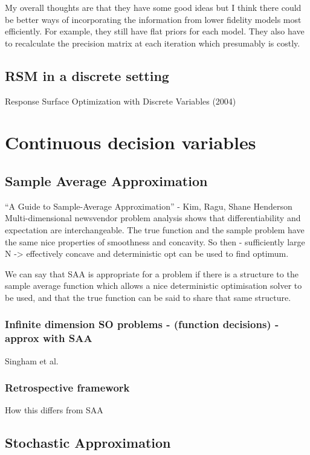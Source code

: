 \documentclass{article}
\begin{document}
My overall thoughts are that they have some good ideas but I think there could be better ways of incorporating the information from lower fidelity models most efficiently. For example, they still have flat priors for each model. They also have to recalculate the precision matrix at each iteration which presumably is costly. 

\subsection{RSM in a discrete setting}

Response Surface Optimization with Discrete Variables (2004)

\section{Continuous decision variables}

\subsection{Sample Average Approximation}

``A Guide to Sample-Average Approximation'' - Kim, Ragu, Shane Henderson
Multi-dimensional newsvendor problem analysis shows that differentiability and expectation are interchangeable. The true function and the sample problem have the same nice properties of smoothness and concavity. So then - sufficiently large N -> effectively concave and deterministic opt can be used to find optimum.

We can say that SAA is appropriate for a problem if there is a structure to the sample average function which allows a nice deterministic optimisation solver to be used, and that the true function can be said to share that same structure.

\subsubsection{Infinite dimension SO problems - (function decisions) - approx with SAA}

Singham et al. 

\subsubsection{Retrospective framework}

How this differs from SAA

\subsection{Stochastic Approximation}
\end{document}
